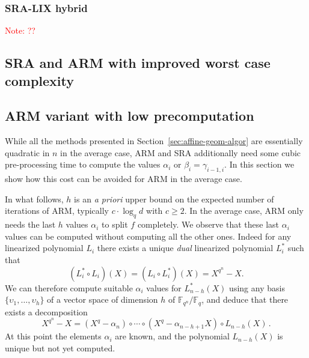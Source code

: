 \documentclass{article}
\newcommand{\ff}[1]{\mathbb{F}_{#1}}
\newcommand{\qq}{q}
\newcommand{\nn}{n}
\newcommand{\qn}{{\qq^\nn}}
\newcommand{\basef}{\ff{\qq}}
\newcommand{\extf}{\ff{\qn}}
\newcounter{algo}
\newcommand{\Notes}[1]{\textcolor{red}{Note: #1}}
\begin{document}
\subsubsection{SRA-LIX hybrid}
\Notes{??}



\subsection{SRA and ARM with improved worst case complexity}
\label{sec:worst-case}


\subsection{ARM variant with low precomputation}
\label{sec:low-precomputation}

While all the methods presented in Section~\ref{sec:affine-geom-algor} are essentially quadratic in $n$ in the average case, ARM and SRA additionally need some cubic pre-processing time to compute the values $\alpha_i$ or $\beta_i=\gamma_{i-1,i}$.
%
In this section we show how this cost can be avoided for ARM in the average case. %

In what follows, $h$ is an \emph{a priori} upper bound on the expected number of iterations of ARM, typically $c \cdot \log_\qq d$ with $c \ge 2$. 
%
In the average case, ARM only needs the last $h$ values $\alpha_i$ to split $f$ completely.
%
We observe that these last $\alpha_i$ values can be computed without computing all the other ones. Indeed 
for any linearized polynomial $L_i$ there exists a unique \emph{dual} linearized polynomial $L_i^\ast$ such that $$(L_i^\ast\circ L_i)(X)=(L_i\circ L_i^\ast)(X)=X^{\qq^\nn}-X.$$
%
We can therefore compute suitable $\alpha_i$ values for $L_{n-h}^\ast(X)$ using any basis $\{\upsilon_{1},\ldots,\upsilon_h\}$ of a vector space of dimension $h$ of $\extf/\basef$, and deduce that there exists a decomposition
$$X^{\qq^\nn}-X=(X^{\qq}-\alpha_n) \circ \cdots \circ (X^{\qq}-\alpha_{n-h+1} X) \circ L_{n-h}(X)\,.$$
At this point the elements $\alpha_i$ are known, and the polynomial $L_{n-h}(X)$ is unique but not yet computed. %
\end{document}
